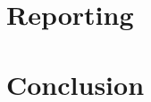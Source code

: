 \documentclass[a4paper,10pt]{article}
\begin{document}


\section{Reporting}

\section{Conclusion}




\end{document}

